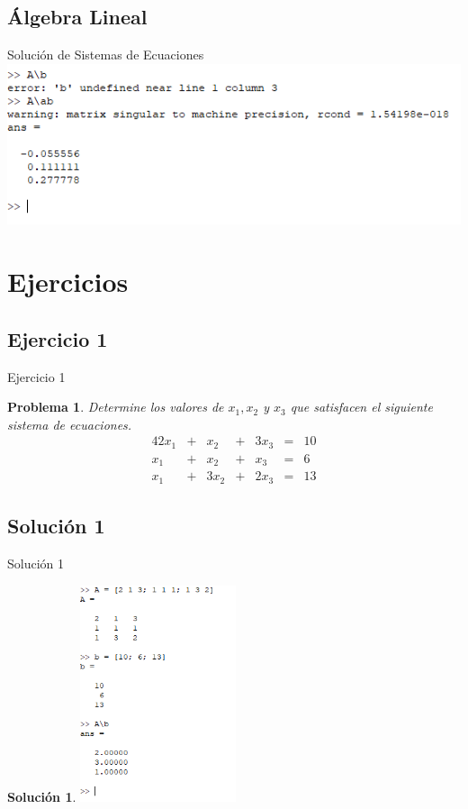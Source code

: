 \documentclass[12pt]{beamer}
\newtheorem{prob}{Problema}
\newtheorem{sol}{Solución}
\begin{document}
\subsection{Álgebra Lineal}
\begin{frame}{Solución de Sistemas de Ecuaciones}
	\includegraphics[]{images/sol.png}
\end{frame}
\section{Ejercicios}
\subsection{Ejercicio 1}
\begin{frame}{Ejercicio 1}
\begin{prob}
Determine los valores de $x_1, x_2$ y $x_3$ que satisfacen el siguiente sistema de ecuaciones.	
\begin{alignat*}{4}
2x_1 & {}+{} &  x_2 & {}+{} & 3x_3 & {}={} & 10 \\
x_1 & {}+{} &  x_2 & {}+{} &  x_3 & {}={} &  6 \\
x_1 & {}+{} & 3x_2 & {}+{} & 2x_3 & {}={} & 13
\end{alignat*}
\end{prob}
\end{frame}
\subsection{Solución 1}
\begin{frame}{Solución 1}
\begin{sol}
	\includegraphics[height=180pt]{images/sol1.png}
\end{sol}
\end{frame}
\end{document}
